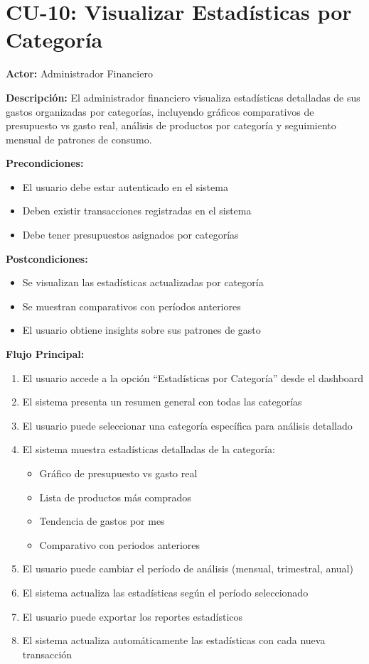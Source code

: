 \section{CU-10: Visualizar Estadísticas por Categoría}

\noindent\textbf{Actor:} Administrador Financiero

\noindent\textbf{Descripción:} El administrador financiero visualiza estadísticas detalladas de sus gastos organizadas por categorías, incluyendo gráficos comparativos de presupuesto vs gasto real, análisis de productos por categoría y seguimiento mensual de patrones de consumo.

\noindent\textbf{Precondiciones:}
\begin{itemize}
    \item El usuario debe estar autenticado en el sistema
    \item Deben existir transacciones registradas en el sistema
    \item Debe tener presupuestos asignados por categorías
\end{itemize}

\noindent\textbf{Postcondiciones:}
\begin{itemize}
    \item Se visualizan las estadísticas actualizadas por categoría
    \item Se muestran comparativos con períodos anteriores
    \item El usuario obtiene insights sobre sus patrones de gasto
\end{itemize}

\noindent\textbf{Flujo Principal:}
\begin{enumerate}
    \item El usuario accede a la opción ``Estadísticas por Categoría'' desde el dashboard
    \item El sistema presenta un resumen general con todas las categorías
    \item El usuario puede seleccionar una categoría específica para análisis detallado
    \item El sistema muestra estadísticas detalladas de la categoría:
    \begin{itemize}
        \item Gráfico de presupuesto vs gasto real
        \item Lista de productos más comprados
        \item Tendencia de gastos por mes
        \item Comparativo con periodos anteriores
    \end{itemize}
    \item El usuario puede cambiar el período de análisis (mensual, trimestral, anual)
    \item El sistema actualiza las estadísticas según el período seleccionado
    \item El usuario puede exportar los reportes estadísticos
    \item El sistema actualiza automáticamente las estadísticas con cada nueva transacción
\end{enumerate}

